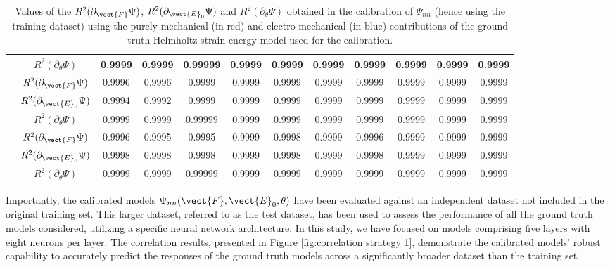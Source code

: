 \begin{table}[hbtp!]
\begin{tabular}{c c c c c c c c c c c c}
&$R^2(\partial_{\theta}\Psi)$ & 0.9999 &  0.9999 & 0.99999 & 0.9999 & 0.9999 & 0.9999 & 0.9999 & 0.9999 & 0.9999 & 0.9999\\	
\midrule
		\multirow{3}{*}{\rotatebox{90}{\textcolor{red}{\textbf{TI}}/\textcolor{blue}{\textbf{ID}}}} &$R^2(\partial_{\vect{F}}\Psi)$ & 0.9996 & 0.9996 & 0.9999 & 0.9999&  0.9999&  0.9999 & 0.9999 & 0.9999 & 0.9999 & 0.9999\\
&$R^2(\partial_{\vect{E}_0}\Psi)$ &  0.9994 & 0.9992 & 0.9999 & 0.9999 & 0.9999 & 0.9999 & 0.9999 & 0.9999 & 0.9999 & 0.9999\\
&$R^2(\partial_{\theta}\Psi)$ & 0.9999 &  0.9999 & 0.99999 & 0.9999 & 0.9999 & 0.9999 & 0.9999 & 0.9999 & 0.9999 & 0.9999\\	
\midrule
		\multirow{3}{*}{\rotatebox{90}{\textcolor{red}{\textbf{MR}}/\textcolor{blue}{\textbf{ES}}}} &$R^2(\partial_{\vect{F}}\Psi)$ &  0.9996 &  0.9995 & 0.9995 & 0.9999 & 0.9998 & 0.9999 & 0.9996 & 0.9999 & 0.9999 & 0.9999\\
&$R^2(\partial_{\vect{E}_0}\Psi)$ & 0.9998 & 0.9998 & 0.9998 & 0.9999 & 0.9998 & 0.9999 & 0.9998 & 0.9999 & 0.9999 & 0.9999\\
&$R^2(\partial_{\theta}\Psi)$ & 0.9999 &  0.9999 & 0.99999 & 0.9999 & 0.9999 & 0.9999 & 0.9999 & 0.9999 & 0.9999 & 0.9999\\	
\midrule
	\end{tabular}
	\caption{Values of the $R^2(\partial_{\vect{F}}\Psi)$, $R^2(\partial_{\vect{E}_0}\Psi)$ and $R^2(\partial_{\theta}\Psi)$ obtained in the calibration of $\Psi_{nn}$ (hence using the training dataset) using the purely mechanical (in red) and electro-mechanical (in blue) contributions of the ground truth Helmholtz strain energy model used for the calibration.}
	\label{table: results calibration strategy 1}
\end{table}


Importantly, the calibrated models $\Psi_{nn}(\vect{F},\vect{E}_0,\theta)$ have been evaluated against an independent dataset not included in the original training set. This larger dataset, referred to as the test dataset, has been used to assess the performance of all the ground truth models considered, utilizing a specific neural network architecture. In this study, we have focused on models comprising five layers with eight neurons per layer. The correlation results, presented in Figure \ref{fig:correlation strategy 1},  demonstrate the calibrated models' robust capability to accurately predict the responses of the ground truth models across a significantly broader dataset than the training set.


